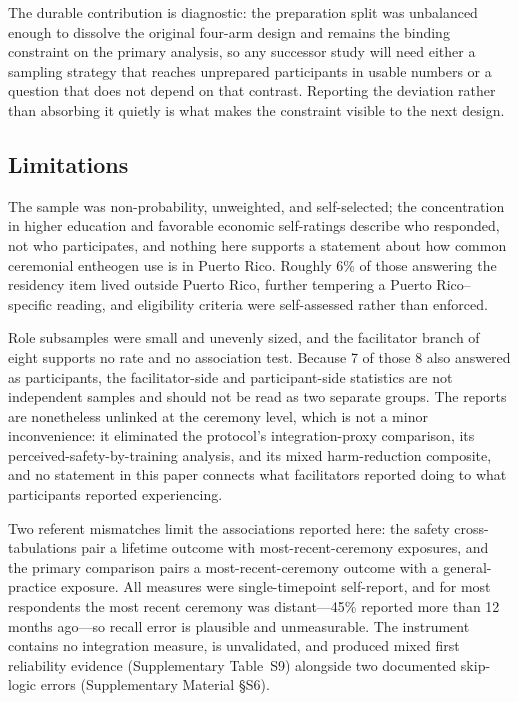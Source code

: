 \documentclass[12pt]{article}
\begin{document}
The durable contribution is diagnostic: the preparation split was unbalanced enough to dissolve the
original four-arm design and remains the binding constraint on the primary analysis, so any successor study
will need either a sampling strategy that reaches unprepared participants in usable numbers or a question
that does not depend on that contrast. Reporting the deviation rather than absorbing it quietly is what
makes the constraint visible to the next design.

\subsection{Limitations}

The sample was non-probability, unweighted, and self-selected; the concentration in higher education and
favorable economic self-ratings describe who responded, not who participates, and nothing here supports a
statement about how common ceremonial entheogen use is in Puerto Rico. Roughly 6\% of those answering the
residency item lived outside Puerto Rico, further tempering a Puerto Rico--specific reading, and eligibility
criteria were self-assessed rather than enforced.

Role subsamples were small and unevenly sized, and the facilitator branch of eight supports no rate and no
association test. Because 7 of those 8 also answered as participants, the facilitator-side and
participant-side statistics are not independent samples and should not be read as two separate groups. The
reports are nonetheless unlinked at the ceremony level, which is not a minor inconvenience: it eliminated
the protocol's integration-proxy comparison, its perceived-safety-by-training analysis, and its mixed
harm-reduction composite, and no statement in this paper connects what facilitators reported doing to what
participants reported experiencing.

Two referent mismatches limit the associations reported here: the safety cross-tabulations pair a lifetime
outcome with most-recent-ceremony exposures, and the primary comparison pairs a most-recent-ceremony
outcome with a general-practice exposure. All measures were single-timepoint self-report, and for most
respondents the most recent ceremony was distant---45\% reported more than 12 months ago---so recall error
is plausible and unmeasurable. The instrument contains no integration measure, is unvalidated,
and produced mixed first reliability evidence (Supplementary Table~S9) alongside two documented skip-logic
errors (Supplementary Material \S S6).
\end{document}
